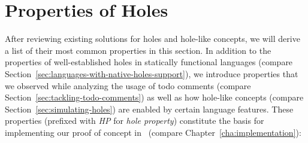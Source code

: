 \section{Properties of Holes}
\label{sec:relevant-properties}
After reviewing existing solutions for holes and hole-like concepts, we will derive a list of their most common properties in this section.
In addition to the properties of well-established holes in statically functional languages (compare Section~\ref{sec:languages-with-native-holes-support}), we introduce properties that we observed while analyzing the usage of todo comments (compare Section~\ref{sec:tackling-todo-comments}) as well as how hole-like concepts (compare Section~\ref{sec:simulating-holes}) are enabled by certain language features.
These properties (prefixed with \emph{HP} for \emph{hole property}) constitute the basis for implementing our proof of concept in \CS\ (compare Chapter~\ref{cha:implementation}):
%
